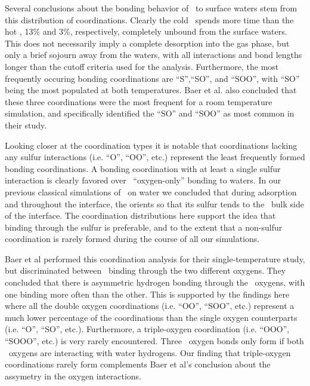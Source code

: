 	Several conclusions about the bonding behavior of \suldiox~to surface waters stem from this distribution of coordinations. Clearly the cold \suldiox~spends more time than the hot \suldiox, 13\% and 3\%, respectively, completely unbound from the surface waters. This does not necessarily imply a complete desorption into the gas phase, but only a brief sojourn away from the waters, with all interactions and bond lengths longer than the cutoff criteria used for the analysis. Furthermore, the most frequently occuring bonding coordinations are ``S'',``SO'', and ``SOO'', with ``SO'' being the most populated at both temperatures. Baer et al. also concluded that these three coordinations were the most frequent for a room temperature simulation, and specifically identified the ``SO'' and ``SOO'' as most common in their study.\cite{Baer2010}

	Looking closer at the coordination types it is notable that coordinations lacking any sulfur interactions (i.e. ``O'', ``OO'', etc.) represent the least frequently formed bonding coordinations. A bonding coordination with at least a single sulfur interaction is clearly favored over \suldiox~``oxygen-only'' bonding to waters. In our previous classical simulations of \suldiox~on water we concluded that during adsorption and throughout the interface, the \suldiox orients so that its sulfur tends to the \wat~bulk side of the interface.\cite{Shamay2011} The coordination distributions here support the idea that binding through the sulfur is preferable, and to the extent that a non-sulfur coordination is rarely formed during the course of all our simulations.

Baer et al performed this coordination analysis for their single-temperature study, but discriminated between \suldiox~binding through the two different oxygens. They concluded that there is asymmetric hydrogen bonding through the \suldiox~oxygens, with one binding more often than the other. This is supported by the findings here where all the double oxygen coordinations (i.e. ``OO'', ``SOO'', etc.) represent a much lower percentage of the coordinations than the single oxygen counterparts (i.e. ``O'', ``SO'', etc.). Furthermore, a triple-oxygen coordination (i.e. ``OOO'', ``SOOO'', etc.) is very rarely encountered. Three \suldiox~oxygen bonds only form if both \suldiox~oxygens are interacting with water hydrogens. Our finding that triple-oxygen coordinations rarely form complements Baer et al's conclusion about the assymetry in the oxygen interactions.

